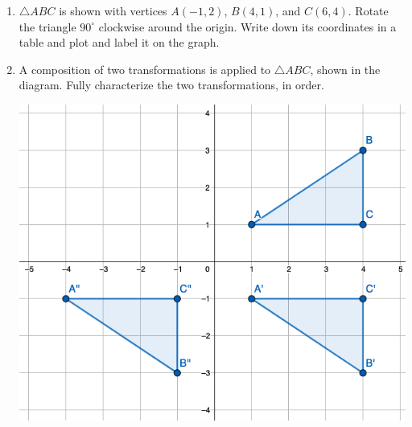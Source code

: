 \begin{enumerate}
\item $\triangle ABC$ is shown with vertices $A(-1,2)$, $B(4,1)$, and $C(6,4)$. Rotate the triangle $90^\circ$ clockwise around the origin. Write down its coordinates in a table and plot and label it on the graph.
\begin{flushright}
  \end{flushright}

\item A composition of two transformations is applied to $\triangle ABC$, shown in the diagram. Fully characterize the two transformations, in order.
  \begin{flushright}
    \includegraphics[width=5in]{../graphics/08reflect+translate.png}
  \end{flushright}


\end{enumerate}
